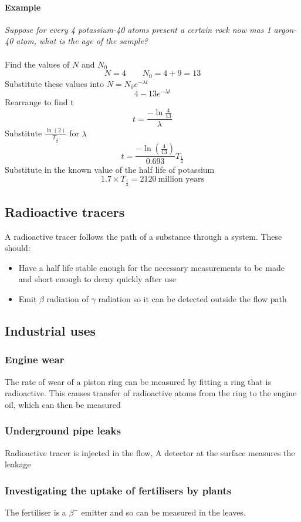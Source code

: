 \documentclass{article}[18pt]
\begin{document}
\paragraph{Example}
\textit{Suppose for every 4 potassium-40 atoms present a certain rock now mas 1 argon-40 atom, what is the age of the sample?}\\
\\
Find the values of $N$ and $N_0$ 
$$N=4 \qquad N_0=4+9=13$$
Substitute these values into $N=N_0e^{-\lambda t}$
$$4-13e^{-\lambda t}$$
Rearrange to find t 
$$t=\frac{-\ln\frac{4}{13}}{\lambda}$$
Substitute $\frac{\ln(2)}{T_{\frac{1}{2}}}$ for $\lambda$
$$t=\frac{-\ln(\frac{4}{13})}{0.693}T_{\frac{1}{2}}$$
Substitute in the known value of the half life of potassium
$$1.7\times T_{\frac{1}{2}}=2120 \  \textrm{million years}$$
\subsection{Radioactive tracers}
A radioactive tracer follows the path of a substance through a system. These should:
\begin{itemize}
\item Have a half life stable enough for the necessary measurements to be made and short enough to decay quickly after use
\item Emit $\beta$ radiation of $\gamma$ radiation so it can be detected outside the flow path
\end{itemize}
\subsection{Industrial uses}
\subsubsection{Engine wear}
The rate of wear of a piston ring can be measured by fitting a ring that is radioactive. This causes transfer of radioactive atoms from the ring to the engine oil, which can then be measured
\subsubsection{Underground pipe leaks}
Radioactive tracer is injected in the flow, A detector at the surface measures the leakage
\subsubsection{Investigating the uptake of fertilisers by plants}
The fertiliser is a $\beta^-$ emitter and so can be measured in the leaves.
\end{document}
